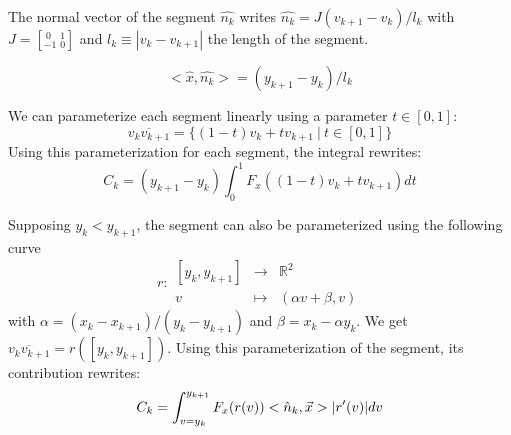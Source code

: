 \documentclass[11pt]{article}
\begin{document}
The normal vector of the segment $\hat{n_k}$ writes $\hat{n_k}=J{(v_{k+1}-v_{k})}/{l_k}$ with  $J=\left[^{~0}_{-1}~^{1}_{0}\right]$ and $l_k\equiv |v_k-v_{k+1}|$ the length of the segment.

$$<\hat{x},\hat{n_k}>=(y_{k+1}-y_k)/{l_k}$$

We can parameterize each segment linearly using a parameter $t\in[0,1]$: 
\begin{equation}
\overline{v_k v_{k+1}}=\{(1-t)v_k+tv_{k+1} ~|~ t\in[0,1]\}
\end{equation}
Using this parameterization for each segment, the integral rewrites:
\begin{equation} 
 C_k=(y_{k+1}-y_k) \int_0^1 F_x((1-t)v_k+t v_{k+1}) dt
 \label{eqn:ck_compact}
 \end{equation}

Supposing $y_k<y_{k+1}$, the segment can also be parameterized using the following curve
\begin{equation} 
r: 
\begin{array}{ccl}
[y_{k},y_{k+1}]&\rightarrow &{\mathbb R}^2\\
v &\mapsto & (\alpha v+\beta,v)
\end{array}
\end{equation}
with $\alpha=(x_k-x_{k+1})/(y_{k}-y_{k+1})$ and $\beta=x_{k}-\alpha y_k$. 
We get $\overline{v_{k}v_{k+1}}=r([y_k,y_{k+1}])$.
Using this parameterization of the segment, its contribution rewrites: 
\begin{equation} 
C_k=\int_{v=y_k}^{y_{k+1}} F_x(r(v))<\hat{n}_k,\vec{x}>|r'(v)|dv\\
\end{equation}
\end{document}
